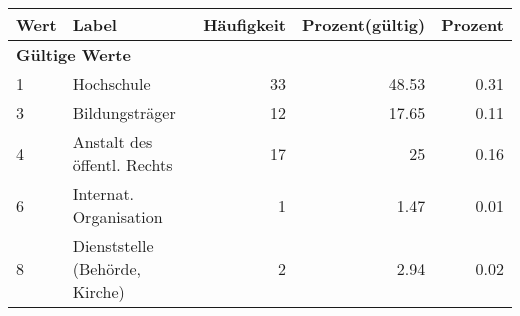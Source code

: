      \begin{longtable}{lXrrr}
     \toprule
     \textbf{Wert} & \textbf{Label} & \textbf{Häufigkeit} & \textbf{Prozent(gültig)} & \textbf{Prozent} \\
     \endhead
     \midrule
     \multicolumn{5}{l}{\textbf{Gültige Werte}}\\

     1 &
     \multicolumn{1}{X}{ Hochschule   } &


       \num{33} &
       \num[round-mode=places,round-precision=2]{48.53} &
         \num[round-mode=places,round-precision=2]{0.31} \\

     3 &
     \multicolumn{1}{X}{ Bildungsträger   } &


       \num{12} &
       \num[round-mode=places,round-precision=2]{17.65} &
         \num[round-mode=places,round-precision=2]{0.11} \\

     4 &
     \multicolumn{1}{X}{ Anstalt des öffentl. Rechts   } &


       \num{17} &
       \num[round-mode=places,round-precision=2]{25} &
         \num[round-mode=places,round-precision=2]{0.16} \\

     6 &
     \multicolumn{1}{X}{ Internat. Organisation   } &


       \num{1} &
       \num[round-mode=places,round-precision=2]{1.47} &
         \num[round-mode=places,round-precision=2]{0.01} \\

     8 &
     \multicolumn{1}{X}{ Dienststelle (Behörde, Kirche)   } &


       \num{2} &
       \num[round-mode=places,round-precision=2]{2.94} &
         \num[round-mode=places,round-precision=2]{0.02} \\


\end{longtable}
